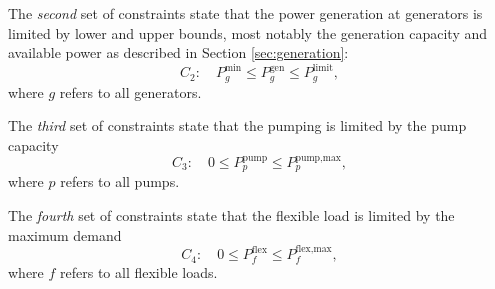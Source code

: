 \documentclass{article}
\begin{document}
The \emph{second} set of constraints state that the power generation at generators is limited by lower and upper bounds, most notably the generation capacity and available power as described in Section \ref{sec:generation}:
\begin{equation}
	C_2:\quad 
	P_g^\text{min} \le P^\text{gen}_g \le P_g^\text{limit},
\end{equation}
where $g$ refers to all generators.

The \emph{third} set of constraints state that the pumping is limited by the pump capacity
\begin{equation}
	C_3:\quad
	0 \le P^\text{pump}_p \le P^\text{pump,max}_p, 
\end{equation}
where $p$ refers to all pumps.

The \emph{fourth} set of constraints state that the flexible load is limited by the maximum demand
\begin{equation}
	C_4:\quad
	0 \le P^\text{flex}_f \le P^\text{flex,max}_f, 
\end{equation}
where $f$ refers to all flexible loads.
\end{document}
